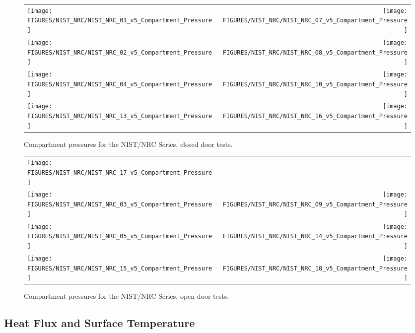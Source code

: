 \begin{figure}[p]
\begin{tabular*}{\textwidth}{l@{\extracolsep{\fill}}r}
\texttt{[image: FIGURES/NIST\_NRC/NIST\_NRC\_01\_v5\_Compartment\_Pressure]} &
\texttt{[image: FIGURES/NIST\_NRC/NIST\_NRC\_07\_v5\_Compartment\_Pressure]} \\
\texttt{[image: FIGURES/NIST\_NRC/NIST\_NRC\_02\_v5\_Compartment\_Pressure]} &
\texttt{[image: FIGURES/NIST\_NRC/NIST\_NRC\_08\_v5\_Compartment\_Pressure]} \\
\texttt{[image: FIGURES/NIST\_NRC/NIST\_NRC\_04\_v5\_Compartment\_Pressure]} &
\texttt{[image: FIGURES/NIST\_NRC/NIST\_NRC\_10\_v5\_Compartment\_Pressure]} \\
\texttt{[image: FIGURES/NIST\_NRC/NIST\_NRC\_13\_v5\_Compartment\_Pressure]} &
\texttt{[image: FIGURES/NIST\_NRC/NIST\_NRC\_16\_v5\_Compartment\_Pressure]}
\end{tabular*}
\caption{Compartment pressures for the NIST/NRC Series, closed door tests.}
\label{NIST_NRC_Pressure_Closed}
\end{figure}

\begin{figure}[p]
\begin{tabular*}{\textwidth}{l@{\extracolsep{\fill}}r}
\texttt{[image: FIGURES/NIST\_NRC/NIST\_NRC\_17\_v5\_Compartment\_Pressure]} &
   \\
\texttt{[image: FIGURES/NIST\_NRC/NIST\_NRC\_03\_v5\_Compartment\_Pressure]} &
\texttt{[image: FIGURES/NIST\_NRC/NIST\_NRC\_09\_v5\_Compartment\_Pressure]} \\
\texttt{[image: FIGURES/NIST\_NRC/NIST\_NRC\_05\_v5\_Compartment\_Pressure]} &
\texttt{[image: FIGURES/NIST\_NRC/NIST\_NRC\_14\_v5\_Compartment\_Pressure]} \\
\texttt{[image: FIGURES/NIST\_NRC/NIST\_NRC\_15\_v5\_Compartment\_Pressure]} &
\texttt{[image: FIGURES/NIST\_NRC/NIST\_NRC\_18\_v5\_Compartment\_Pressure]}
\end{tabular*}
\caption{Compartment pressures for the NIST/NRC Series, open door tests.}
\label{NIST_NRC_Pressure_Open}
\end{figure}

\clearpage

\subsection{Heat Flux and Surface Temperature}

